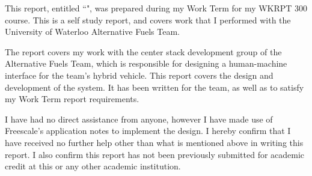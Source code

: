 \documentclass[ece]{uw-wkrpt}
\begin{document}
\begin{letter}
This report, entitled ``\thetitle", was prepared during my \theterm{} Work Term
for my WKRPT 300 course. This is a self study report, and covers work that I 
performed with the University of Waterloo Alternative Fuels Team.

The report covers my work with the center stack development group of the
Alternative Fuels Team, which is responsible for designing a human-machine
interface for the team's hybrid vehicle. This report covers the design and
development of the system. It has been written for the team, as well as
to satisfy my Work Term report requirements.

I have had no direct assistance from anyone, however I have made use of
Freescale's application notes to implement the design.
I hereby confirm that I have received no further help other than what is
mentioned above in writing this report. I also confirm this report has not
been previously submitted for academic credit at this or
any other academic institution.

\end{letter}
\end{document}
